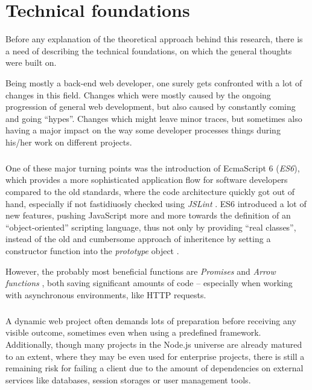 \chapter{Technical foundations}
\label{cha:technicalfoundations}

Before any explanation of the theoretical approach behind this research, there is a need of describing the technical foundations, on which the general thoughts were built on.

Being mostly a back-end web developer, one surely gets confronted with a lot of changes in this field. Changes which were mostly caused by the ongoing progression of general web development, but also caused by constantly coming and going ``hypes''. Changes which might leave minor traces, but sometimes also having a major impact on the way some developer processes things during his/her work on different projects.

\paragraph{} %
One of these major turning points was the introduction of EcmaScript 6 (\emph{ES6}), which provides a more sophisticated application flow for software developers compared to the old standards, where the code architecture quickly got out of hand, especially if not fastidiuosly checked using \emph{JSLint} \cite{JSLintDocumentation}. ES6 introduced a lot of new features, pushing JavaScript more and more towards the definition of an ``object-oriented'' scripting language, thus not only by providing ``real classes'', instead of the old and cumbersome approach of inheritence by setting a constructor function into the \emph{prototype} object \cite[47]{crockford2008javascript}.

However, the probably most beneficial functions are \emph{Promises} \cite{MDNPromise} and \emph{Arrow functions} \cite{MDNArrowFunctions}, both saving significant amounts of code -- especially when working with asynchronous environments, like HTTP requests.

\paragraph{} %
A dynamic web project often demands lots of preparation before receiving any visible outcome, sometimes even when using a predefined framework. Additionally, though many projects in the Node.js universe are already matured to an extent, where they may be even used for enterprise projects, there is still a remaining risk for failing a client due to the amount of dependencies on external services like databases, session storages or user management tools.


